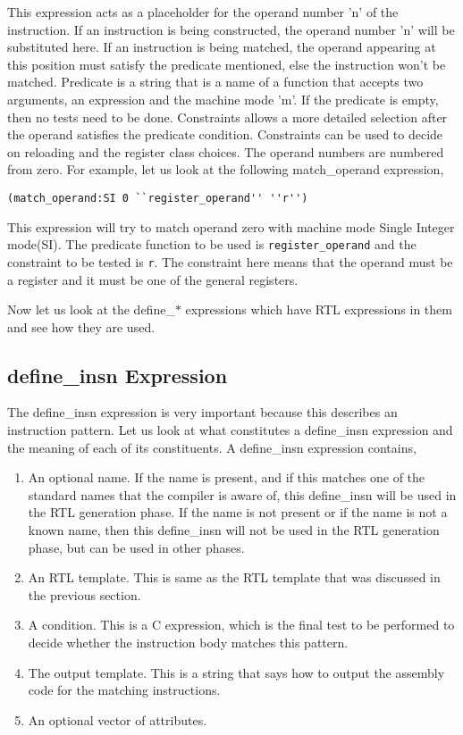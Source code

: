 This expression acts as a placeholder for the operand number 'n' of the instruction. If an instruction is being constructed,
the operand number 'n' will be substituted here. If an instruction is being matched, the operand appearing at this position must 
satisfy the predicate mentioned, else the instruction won't be matched. Predicate is a string that is a name of a function that
accepts two arguments, an expression and the machine mode 'm'. If the predicate is empty, then no tests need to be done. 
Constraints allows a more detailed selection after the operand satisfies the predicate condition. Constraints can be used to 
decide on reloading and the register class choices. The operand numbers are numbered from zero. For example, let us look at the following match\_operand expression,

\begin{example}
\begin{verbatim}
(match_operand:SI 0 ``register_operand'' ''r'')
\end{verbatim}
\end{example}


This expression will try to match operand zero with machine mode Single Integer mode(SI). The predicate function to be used is 
{\tt register\_operand} and the constraint to be tested is {\tt r}. The constraint here means that the operand must be a register and it
must be one of the general registers.

 Now let us look at the define\_$\ast$ expressions
which have RTL expressions in them and see how they are used. 

\subsection{define\_insn Expression}

 The define\_insn expression is
very important because this describes an instruction pattern. Let us look at what constitutes a define\_insn expression and the
meaning of each of its constituents. A define\_insn expression contains,
\begin{enumerate}
 \item An optional name. If the name is present, and if this matches one of the standard names that the compiler is aware of,
this define\_insn will be used in the RTL generation phase. If the name is not present or if the name is not a known name, then
this define\_insn will not be used in the RTL generation phase, but can be used in other phases.
\item An RTL template. This is same as the RTL template that was discussed in the previous section.
\item A condition. This is a C expression, which is the final test to be performed to decide whether the instruction body matches this pattern.
\item The output template. This is a string that says how to output the assembly code for the matching instructions.
\item An optional vector of attributes. 
\end{enumerate}

